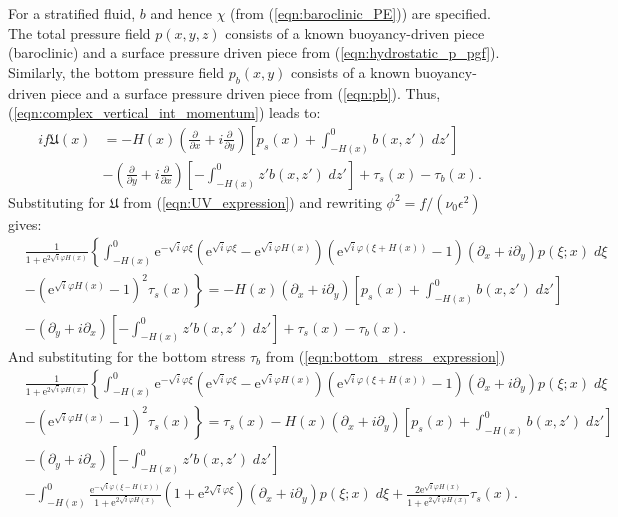 \documentclass[10pt]{amsart}
\begin{document}
For a stratified fluid, $b$ and hence $\chi$ (from (\ref{eqn:baroclinic_PE})) are specified. 
The total pressure field $p(x,y,z)$ consists of a known buoyancy-driven piece (baroclinic) and a surface pressure driven piece from (\ref{eqn:hydrostatic_p_pgf}).
Similarly, the bottom pressure field $p_b(x,y)$ consists of a known buoyancy-driven piece and a surface pressure driven piece from (\ref{eqn:pb}).
Thus, (\ref{eqn:complex_vertical_int_momentum}) leads to:
\begin{align}
i f \mathfrak{U}(x) & = - H(x) \left(\frac{\partial}{\partial x} + i \frac{\partial}{\partial y} \right)
\left[ 
p_s(x) + \int_{-H(x)}^{0} b(x,z') \; dz'
\right] \nonumber \\
& - \left(\frac{\partial }{\partial y} + i \frac{\partial}{\partial x}  \right)  
\left[
 - \int_{-H(x)}^0 z' b(x,z') \; dz'
 \right]
+ \tau_s(x)  - \tau_b (x) .
 \end{align}
 Substituting for $\mathfrak{U}$ from (\ref{eqn:UV_expression}) and rewriting $\phi^2 = f / (\nu_0 \epsilon^2)$ gives:
 \begin{align}
& \frac{1 }{{ 1 + \mathrm{e}^{2 \sqrt{i} \varphi H(x )} } } 
\left\{
 \int_{-H(x)}^{0} 
\mathrm{e}^{-\sqrt{i} \varphi \xi} 
\left(
\mathrm{e}^{\sqrt{i} \varphi \xi} - 
\mathrm{e}^{\sqrt{i} \varphi H(x)} 
\right) \left(
\mathrm{e}^{\sqrt{i} \varphi  \left( \xi + H(x) \right)} - 1
\right)
 \left( \partial_x  + i \partial_y  \right) p( \xi; x)  \; d \xi  \right. \nonumber \\
& - \left.
\left( 
\mathrm{e}^{\sqrt{i} \varphi  H(x) }   - 1   
\right)^2
\tau_s (x)  \right\} 
= - H(x)  \left( \partial_x  + i \partial_y  \right)
\left[ 
p_s(x) + \int_{-H(x)}^{0} b(x,z') \; dz'
\right] \nonumber \\
& -  \left( \partial_y  + i \partial_x  \right)
\left[
 - \int_{-H(x)}^0 z' b(x,z') \; dz'
 \right]
+ \tau_s (x)  - \tau_b (x) .
\end{align}
And substituting for the bottom stress $\tau_b$ from (\ref{eqn:bottom_stress_expression})
 \begin{align}
& \frac{1 }{{1 + \mathrm{e}^{2 \sqrt{i} \varphi H(x )} } } 
\left\{
 \int_{-H(x)}^{0} 
\mathrm{e}^{-\sqrt{i} \varphi \xi} 
\left(
\mathrm{e}^{\sqrt{i} \varphi \xi} - 
\mathrm{e}^{\sqrt{i} \varphi H(x)} 
\right) \left(
\mathrm{e}^{\sqrt{i} \varphi  \left( \xi + H(x) \right)} - 1
\right)
 \left( \partial_x  + i \partial_y  \right) p( \xi; x) \; d \xi  \right. \nonumber \\
& - \left.
\left( 
\mathrm{e}^{\sqrt{i} \varphi  H(x) }   - 1   
\right)^2
\tau_s (x)   \right\} 
 =
 \tau_s (x)
 - H(x) \left( \partial_x  + i \partial_y  \right)
\left[ 
p_s(x) + \int_{-H(x)}^{0} b(x,z') \; dz'
\right] \nonumber \\
& - \left( \partial_y  + i \partial_x  \right)
\left[
 - \int_{-H(x)}^0 z' b(x,z') \; dz'
 \right] \nonumber \\
&- 
\int_{-H(x)}^{0} 
\frac{ \mathrm{e}^{-\sqrt{i} \varphi (\xi - H(x))  } }{ 1 + \mathrm{e}^{2 \sqrt{i} \varphi H \left(x \right)} }
\left( 1 + \mathrm{e}^{2 \sqrt{i} \varphi \xi}\right) 
 \left( \partial_x  + i \partial_y \right) p( \xi; x)  \; d \xi 
+\frac{ 2 \mathrm{e}^{\sqrt{i} \varphi H(x)  } }{ 1 + \mathrm{e}^{2 \sqrt{i} \varphi H \left(x \right)} }
\tau_s (x)
. \nonumber
\end{align}
\end{document}
